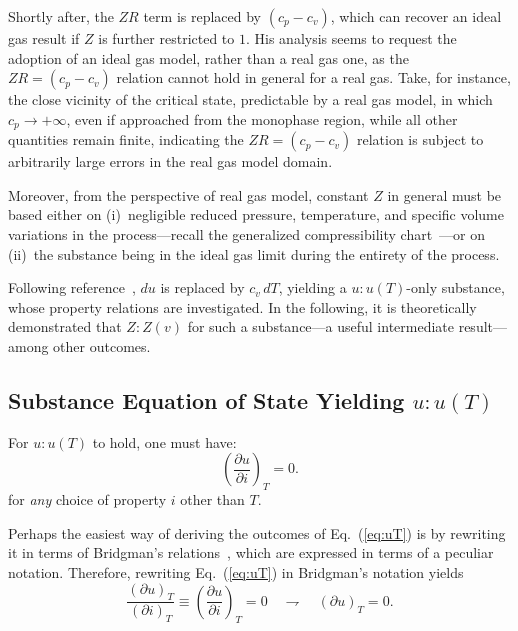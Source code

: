 \documentclass[fleqn,11pt]{SelfArx}
\newcommand{\parxyz}[3]{\left(\frac{\partial {{#1}}}{\partial {{#2}}}\right)_{\!\!\!{#3}}}
\newcommand{\bri}[2]{(\partial {{#1}})_{{#2}}}
\begin{document}
    Shortly after, the $ZR$ term is replaced by $(c_p - c_v)$, which can recover  an  ideal  gas
    result if $Z$ is further restricted to $1$. His analysis seems to request the adoption of an
    ideal gas model, rather than a real gas one, as the $ZR = (c_p - c_v)$ relation cannot  hold
    in general for a real gas. Take, for instance, the close vicinity  of  the  critical  state,
    predictable by a real gas model, in which $c_p \to +\infty$, even  if  approached  from  the
    monophase region, while all other quantities remain finite, indicating  the  $ZR  =  (c_p  -
    c_v)$ relation is subject to arbitrarily large errors in the real gas model domain.

    Moreover, from the perspective of real gas model, constant $Z$  in  general  must  be  based
    either on (i)~negligible reduced pressure, temperature, and specific  volume  variations  in
    the           process---recall           the           generalized           compressibility
    chart~\cite{2013-CengelYA+BolesMA-AMGH}---or on (ii)~the substance being in  the  ideal  gas
    limit during the entirety of the process.

    Following reference~\cite{2012-ChristiansJ-IntJMechEngEduc}, $du$ is replaced by  $c_v\,dT$,
    yielding a $u\!:\!u(T)$-only substance, whose property relations are  investigated.  In  the
    following, it is theoretically demonstrated  that  $Z\!:\!Z(v)$  for  such  a  substance---a
    useful intermediate result---among other outcomes.

    \subsection{Substance Equation of State Yielding $u\!:\!u(T)$}\label{sec:subst.eos}

    For $u\!:\!u(T)$ to hold, one must have:
    \begin{equation}
        \parxyz uiT = 0.
        \label{eq:uT}
    \end{equation}
    \noindent for \emph{any} choice of property $i$ other than $T$.

    Perhaps the easiest way of deriving the outcomes of Eq.~(\ref{eq:uT}) is by rewriting it  in
    terms of Bridgman's relations~\cite{2006-BejanA-Wiley}, which are expressed in  terms  of  a
    peculiar notation. Therefore, rewriting Eq.~(\ref{eq:uT}) in Bridgman's notation yields
    \begin{equation}
        \frac{\bri uT}{\bri iT} \equiv \parxyz uiT = 0 \quad\rightharpoondown\quad \bri uT = 0.
        \label{eq:uT.bri}
    \end{equation}
\end{document}
